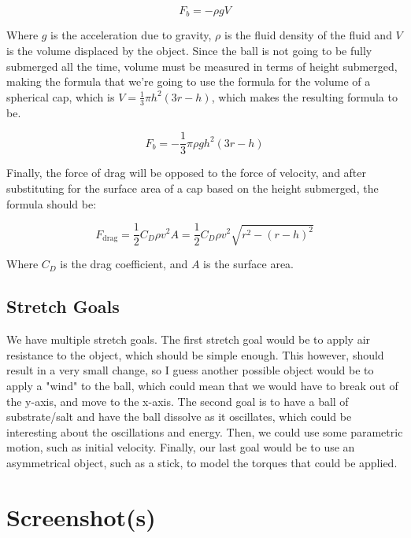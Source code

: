 \documentclass{article}
\begin{document}
$$F_b = -\rho gV$$

Where $g$ is the acceleration due to gravity, $\rho$ is the fluid density of the fluid and $V$ is the volume displaced by the object. Since the ball is not going to be fully submerged all the time, volume must be measured in terms of height submerged, making the formula that we're going to use the formula for the volume of a spherical cap, which is $V = \frac{1}{3}\pi h^2 (3r - h)$, which makes the resulting formula to be.

$$F_b = - \frac{1}{3} \pi \rho g h^2 (3r - h)$$

Finally, the force of drag will be opposed to the force of velocity, and after substituting for the surface area of a cap based on the height submerged, the formula should be:

$$F_{\text{drag}} = \frac{1}{2} C_D \rho v^2 A = \frac{1}{2} C_D \rho v^2 \sqrt{r^2 - (r-h)^2}$$

Where $C_D$ is the drag coefficient, and $A$ is the surface area.

\subsection{Stretch Goals}

We have multiple stretch goals. The first stretch goal would be to apply air resistance to the object, which should be simple enough. This however, should result in a very small change, so I guess another possible object would be to apply a "wind" to the ball, which could mean that we would have to break out of the y-axis, and move to the x-axis. The second goal is to have a ball of substrate/salt and have the ball dissolve as it oscillates, which could be interesting about the oscillations and energy. Then, we could use some parametric motion, such as initial velocity. Finally, our last goal would be to use an asymmetrical object, such as a stick, to model the torques that could be applied.

\section{Screenshot(s)}
\end{document}
